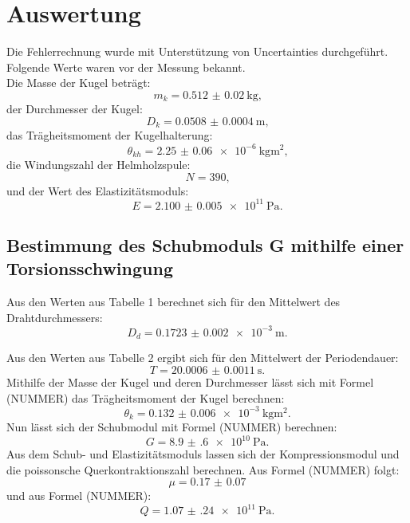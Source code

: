 
\section{Auswertung}
\label{sec:Auswertung}
Die Fehlerrechnung wurde mit Unterstützung von Uncertainties \cite{uncertainties} durchgeführt.
Folgende Werte waren vor der Messung bekannt.\\
Die Masse der Kugel beträgt:
\begin{equation}
	m_k = \SI{0.512(20)}{\kilogram}\text{,}
\end{equation}
der Durchmesser der Kugel:
\begin{equation}
	D_{k} = \SI{0.0508(4)}{\meter}\text{,}
\end{equation}
das Trägheitsmoment der Kugelhalterung:  
\begin{equation}
	\theta_{kh} = \SI{2.25(6)e-6}{\kilogram\meter\squared}\text{,}
\end{equation}
die Windungszahl der Helmholzspule:
\begin{equation}
	N = \num{390}\text{,}
\end{equation}
und der Wert des Elastizitätsmoduls:  
\begin{equation}
	E = \SI{2.100(5)e11}{\pascal}\text{.}
\end{equation}




\subsection{Bestimmung des Schubmoduls G mithilfe einer Torsionsschwingung}

Aus den Werten aus Tabelle 1 berechnet sich für den Mittelwert des Drahtdurchmessers:
\begin{equation}
	D_d = \SI{0.1723(20)e-3}{\meter}\text{.}
\end{equation}

Aus den Werten aus Tabelle 2 ergibt sich für den Mittelwert der Periodendauer:
\begin{equation}
	T = \SI{20.0006(11)}{\second}\text{.}
\end{equation}
Mithilfe der Masse der Kugel und deren Durchmesser lässt sich mit Formel (NUMMER) das Trägheitsmoment der Kugel berechnen:
\begin{equation}
	\theta_{k} = \SI{0.132(6)e-3}{\kilogram\meter\squared}\text{.}
\end{equation}
Nun lässt sich der Schubmodul mit Formel (NUMMER) berechnen:
\begin{equation}
	G = \SI{8.9(6)e10}{\pascal}\text{.}
\end{equation}
Aus dem Schub- und Elastizitätsmoduls lassen sich der Kompressionsmodul und die poissonsche Querkontraktionszahl berechnen. Aus Formel (NUMMER) folgt:
\begin{equation}
	\mu = \num{0.17(7)}
\end{equation}
und aus Formel (NUMMER):
\begin{equation}
	Q = \SI{1.07(24)e11}{\pascal}\text{.}
\end{equation}

